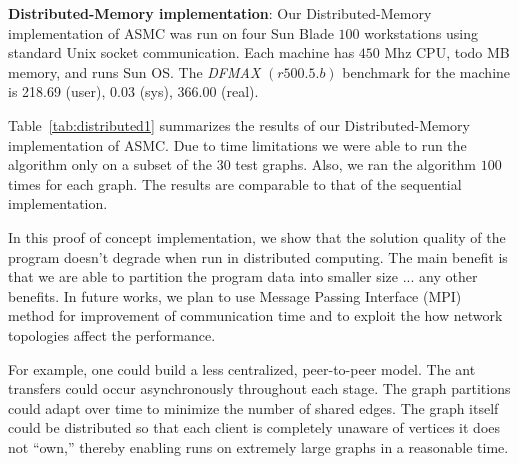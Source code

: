 \documentclass[11pt]{article}
\begin{document}
\textbf{Distributed-Memory implementation}: Our Distributed-Memory implementation of ASMC was run on four Sun Blade $100$  workstations using standard Unix socket communication.  Each machine has $450$ Mhz CPU, todo MB memory, and runs Sun OS.  The \textit{DFMAX} $(r500.5.b)$ benchmark for the machine is 218.69 (user), 0.03 (sys), 366.00 (real).%


Table~\ref{tab:distributed1} summarizes the results of our Distributed-Memory implementation of ASMC. Due to time limitations we were able to run the algorithm only on a subset of the $30$ test graphs.  Also, we ran the algorithm $100$ times for each graph.  The results are comparable to that of the sequential implementation. 


In this proof of concept implementation, we show that the solution quality of the program doesn't degrade when run in distributed computing.  The main benefit is that we are able to partition the program data into smaller size ... any other benefits.  In future works, we plan to use Message Passing Interface (MPI) method for improvement of communication time and to exploit the how network topologies affect the performance. 




For example, one could build a less centralized, peer-to-peer
model.  The ant transfers could occur asynchronously throughout each stage.
The graph partitions could adapt over time to minimize the number of shared
edges.  The graph itself could be distributed so that each client is
completely unaware of vertices it does not ``own,'' thereby enabling runs on
extremely large graphs in a reasonable time.



\end{document}
